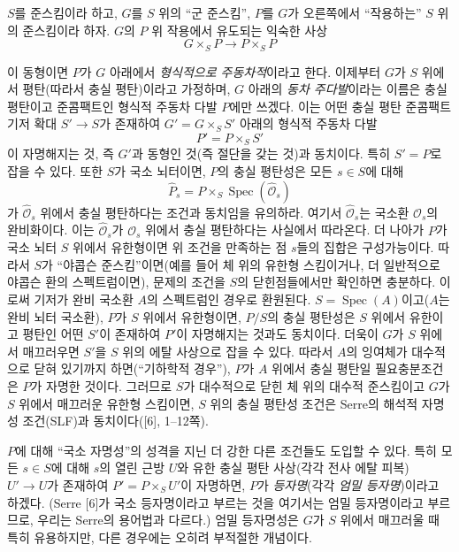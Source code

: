 \documentclass[11pt,twoside,openany]{book}
\numberwithin{equation}{section}
\newcommand{\sourceunit}{front}
\newcommand{\src}[1]{%
  \phantomsection\hypertarget{src:\sourceunit:#1}{}%
  \marginpar{\raggedleft\footnotesize\sffamily #1}%
}
\theoremstyle{plain}
\theoremstyle{definition}
\theoremstyle{remark}
\begin{document}
$S$를 준스킴이라 하고, $G$를 $S$ 위의 ``군 준스킴'', $P$를 $G$가
오른쪽에서 ``작용하는'' $S$ 위의 준스킴이라 하자. $G$의 $P$ 위 작용에서
유도되는 익숙한 사상
\[
  G\times_SP\longrightarrow P\times_SP
\]

\src{325}
이 동형이면 $P$가 $G$ 아래에서 \emph{형식적으로 주동차적}이라고 한다.
이제부터 $G$가 $S$ 위에서 평탄(따라서 충실 평탄)이라고 가정하며,
$G$ 아래의 \emph{동차 주다발}이라는 이름은 충실 평탄이고 준콤팩트인
형식적 주동차 다발 $P$에만 쓰겠다. 이는 어떤 충실 평탄 준콤팩트 기저
확대 $S'\longrightarrow S$가 존재하여 $G'=G\times_SS'$ 아래의 형식적
주동차 다발
\[
  P'=P\times_SS'
\]
이 자명해지는 것, 즉 $G'$과 동형인 것(즉 절단을 갖는 것)과 동치이다.
특히 $S'=P$로 잡을 수 있다. 또한 $S$가 국소 뇌터이면, $P$의 충실
평탄성은 모든 $s\in S$에 대해
\[
  \widehat P_s=P\times_S\operatorname{Spec}(\widehat{\mathcal O}_s)
\]
가 $\widehat{\mathcal O}_s$ 위에서 충실 평탄하다는 조건과 동치임을
유의하라. 여기서 $\widehat{\mathcal O}_s$는 국소환 $\mathcal O_s$의
완비화이다. 이는 $\widehat{\mathcal O}_s$가 $\mathcal O_s$ 위에서 충실
평탄하다는 사실에서 따라온다. 더 나아가 $P$가 국소 뇌터 $S$ 위에서
유한형이면 위 조건을 만족하는 점 $s$들의 집합은 구성가능이다. 따라서
$S$가 ``야콥슨 준스킴''이면(예를 들어 체 위의 유한형 스킴이거나, 더
일반적으로 야콥슨 환의 스펙트럼이면), 문제의 조건을 $S$의 닫힌점들에서만
확인하면 충분하다. 이로써 기저가 완비 국소환 $A$의 스펙트럼인 경우로
환원된다. $S=\operatorname{Spec}(A)$이고($A$는 완비 뇌터 국소환), $P$가
$S$ 위에서 유한형이면, $P/S$의 충실 평탄성은 $S$ 위에서 유한이고
평탄인 어떤 $S'$이 존재하여 $P'$이 자명해지는 것과도 동치이다. 더욱이
$G$가 $S$ 위에서 매끄러우면 $S'$을 $S$ 위의 에탈 사상으로 잡을 수
있다. 따라서 $A$의 잉여체가 대수적으로 닫혀 있기까지 하면(``기하학적
경우''), $P$가 $A$ 위에서 충실 평탄일 필요충분조건은 $P$가 자명한
것이다. 그러므로 $S$가 대수적으로 닫힌 체 위의 대수적 준스킴이고
$G$가 $S$ 위에서 매끄러운 유한형 스킴이면, $S$ 위의 충실 평탄성 조건은
Serre의 해석적 자명성 조건(SLF)과 동치이다([6], 1--12쪽).

$P$에 대해 ``국소 자명성''의 성격을 지닌 더 강한 다른 조건들도 도입할
수 있다. 특히 모든 $s\in S$에 대해 $s$의 열린 근방 $U$와 유한 충실
평탄 사상(각각 전사 에탈 피복) $U'\longrightarrow U$가 존재하여
$P'=P\times_SU'$이 자명하면, $P$가 \emph{등자명}(각각 \emph{엄밀
등자명})이라고 하겠다. (Serre [6]가 국소 등자명이라고 부르는 것을
여기서는 엄밀 등자명이라고 부르므로, 우리는 Serre의 용어법과 다르다.)
엄밀 등자명성은 $G$가 $S$ 위에서 매끄러울 때 특히 유용하지만, 다른
경우에는 오히려 부적절한 개념이다.
\end{document}
